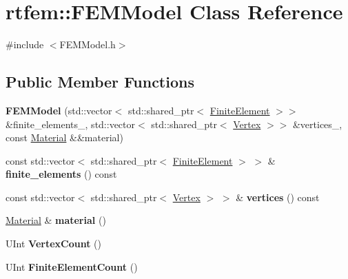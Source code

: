 \hypertarget{classrtfem_1_1FEMModel}{}\section{rtfem\+:\+:F\+E\+M\+Model Class Reference}
\label{classrtfem_1_1FEMModel}


{\ttfamily \#include $<$F\+E\+M\+Model.\+h$>$}

\subsection*{Public Member Functions}
\begin{DoxyCompactItemize}
\item 
\mbox{\label{classrtfem_1_1FEMModel_ad42ae0bcf7a820c8c0a0bba6ebe56d12}} 
{\bfseries F\+E\+M\+Model} (std\+::vector$<$ std\+::shared\+\_\+ptr$<$ \hyperlink{classrtfem_1_1FiniteElement}{Finite\+Element} $>$$>$ \&finite\+\_\+elements\+\_\+, std\+::vector$<$ std\+::shared\+\_\+ptr$<$ \hyperlink{classrtfem_1_1Vertex}{Vertex} $>$$>$ \&vertices\+\_\+, const \hyperlink{structrtfem_1_1Material}{Material} \&\&material)
\item 
\mbox{\label{classrtfem_1_1FEMModel_aef907014b922f5815df70d620761bb1c}} 
const std\+::vector$<$ std\+::shared\+\_\+ptr$<$ \hyperlink{classrtfem_1_1FiniteElement}{Finite\+Element} $>$ $>$ \& {\bfseries finite\+\_\+elements} () const
\item 
\mbox{\label{classrtfem_1_1FEMModel_a97bfc0a7d29557bebe4014ceb2f74b13}} 
const std\+::vector$<$ std\+::shared\+\_\+ptr$<$ \hyperlink{classrtfem_1_1Vertex}{Vertex} $>$ $>$ \& {\bfseries vertices} () const
\item 
\mbox{\label{classrtfem_1_1FEMModel_ae5582a990cf4d4c8cda4f7cc44e947ba}} 
\hyperlink{structrtfem_1_1Material}{Material} \& {\bfseries material} ()
\item 
\mbox{\label{classrtfem_1_1FEMModel_a20227bb6ddae580e8f4251b4b0c31edc}} 
U\+Int {\bfseries Vertex\+Count} ()
\item 
\mbox{\label{classrtfem_1_1FEMModel_a9eeb90bb47a133bba20c39d95c073fbc}} 
U\+Int {\bfseries Finite\+Element\+Count} ()
\end{DoxyCompactItemize}



